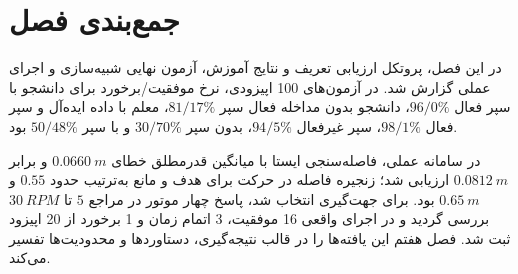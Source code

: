 \section{جمع‌بندی فصل}
\label{sec:chapter6_summary}

در این فصل، پروتکل ارزیابی تعریف و نتایج آموزش، آزمون نهایی شبیه‌سازی و اجرای عملی گزارش شد. در آزمون‌های 100 اپیزودی، نرخ موفقیت/برخورد برای دانشجو با سپر فعال $96/0\%$، دانشجو بدون مداخله فعال سپر $81/17\%$، معلم با داده ایده‌آل و سپر فعال $98/1\%$، سپر غیرفعال $94/5\%$،  بدون سپر $30/70\%$ و  با سپر $50/48\%$ بود.

در سامانه عملی، فاصله‌سنجی ایستا با میانگین قدرمطلق خطای $0.0660~m$ و  برابر $0.0812~m$ ارزیابی شد؛  زنجیره فاصله در حرکت برای هدف و مانع به‌ترتیب حدود $0.55$ و $0.65~m$ بود.  برای جهت‌گیری انتخاب شد، پاسخ چهار موتور در مراجع $5$ تا $30~RPM$ بررسی گردید و در اجرای واقعی 16 موفقیت، 3 اتمام زمان و 1 برخورد از 20 اپیزود ثبت شد. فصل هفتم این یافته‌ها را در قالب نتیجه‌گیری، دستاوردها و محدودیت‌ها تفسیر می‌کند.

